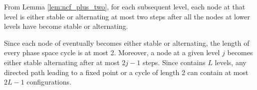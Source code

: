 From Lemma \ref{lem:ncf_plus_two},
for each subsequent level, each node at that level 
is either stable or alternating at most two steps after
all the nodes at lower levels have become stable or alternating.

Since each node of  \cals{} eventually becomes either stable or alternating,
 the length of every phase space cycle is at most 2.
Moreover, a node at a given level $j$ becomes either stable alternating
after at most $2j-1$ steps.
Since  \cals{} contains $L$ levels,
any directed path leading to a fixed point or a cycle of length 2
can contain at most $2L-1$ configurations.
\QED
